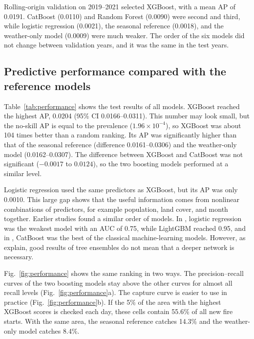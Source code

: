 Rolling-origin validation on 2019--2021 selected XGBoost, with a mean AP of 0.0191. CatBoost (0.0110) and Random Forest (0.0090) were second and third, while logistic regression (0.0021), the seasonal reference (0.0018), and the weather-only model (0.0009) were much weaker. The order of the six models did not change between validation years, and it was the same in the test years.

\subsection{Predictive performance compared with the reference models}\label{sec:res_performance}

Table~\ref{tab:performance} shows the test results of all models. XGBoost reached the highest AP, 0.0204 (95\% CI 0.0166--0.0311). This number may look small, but the no-skill AP is equal to the prevalence ($1.96\times10^{-4}$), so XGBoost was about 104 times better than a random ranking. Its AP was significantly higher than that of the seasonal reference (difference 0.0161--0.0306) and the weather-only model (0.0162--0.0307). The difference between XGBoost and CatBoost was not significant ($-0.0017$ to $0.0124$), so the two boosting models performed at a similar level.

Logistic regression used the same predictors as XGBoost, but its AP was only 0.0010. This large gap shows that the useful information comes from nonlinear combinations of predictors, for example population, land cover, and month together. Earlier studies found a similar order of models. In \cite{jadouli2024morocco}, logistic regression was the weakest model with an AUC of 0.75, while LightGBM reached 0.95, and in \cite{ouazri2026catboost}, CatBoost was the best of the classical machine-learning models. However, as \cite{biswas2025geoai} explain, good results of tree ensembles do not mean that a deeper network is necessary.

Fig.~\ref{fig:performance} shows the same ranking in two ways. The precision--recall curves of the two boosting models stay above the other curves for almost all recall levels (Fig.~\ref{fig:performance}a). The capture curve is easier to use in practice (Fig.~\ref{fig:performance}b). If the 5\% of the area with the highest XGBoost scores is checked each day, these cells contain 55.6\% of all new fire starts. With the same area, the seasonal reference catches 14.3\% and the weather-only model catches 8.4\%.

